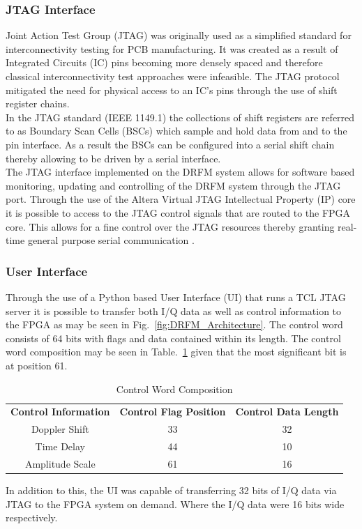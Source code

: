 		\subsubsection{JTAG Interface}
		 Joint Action Test Group (JTAG) was originally used as a simplified standard for interconnectivity testing for PCB manufacturing. It was created as a result of Integrated Circuits (IC) pins becoming more densely spaced and therefore classical interconnectivity test approaches were infeasible. The JTAG protocol mitigated the need for physical access to an IC's pins through the use of shift register chains.  \\ \newline In the JTAG standard (IEEE 1149.1) the collections of shift registers are referred to as Boundary Scan Cells (BSCs) which sample and hold data from and to the pin interface. As a result the BSCs can be configured into a serial shift chain thereby allowing to be driven by a serial interface. \\ \newline 	The JTAG interface implemented on the DRFM system allows for software based monitoring, updating and controlling of the DRFM system through the JTAG port.  Through the use of the Altera Virtual JTAG Intellectual Property (IP) core it is possible to access to the JTAG control signals that are routed to the FPGA core. This allows for a fine control over the JTAG resources thereby granting real-time general purpose serial communication \cite{JTAG}. \\ 
		\subsubsection{User Interface}
		Through the use of  a Python  based User Interface (UI) that runs a TCL JTAG server it is possible to transfer both I/Q data as well as control information to the FPGA as may be seen in Fig.~\ref{fig:DRFM_Architecture}. The control word consists of 64 bits with flags and data contained within its length. The control word composition may be seen in Table.~\ref{tab:Control_Info} given that the most significant bit is at position 61.
		
		\begin{table}[h!]
			\centering
			\caption{Control Word Composition}
			\begin{tabular}{ccc}

				\textbf{Control Information} & \textbf{Control Flag Position} & \textbf{Control Data Length} \\ 
				Doppler Shift 	& 33 & 32  \\
				Time Delay    	& 44 & 10 \\
				Amplitude Scale & 61 & 16 
			\end{tabular}
		\label{tab:Control_Info}
		\end{table}
		\noindent In addition to this, the UI was capable of transferring 32 bits of I/Q data via JTAG to the FPGA system on demand. Where the I/Q data were 16 bits wide respectively. 
	
